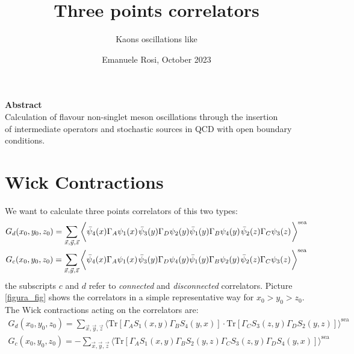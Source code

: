 \documentclass[11pt,a4paper]{article}
\begin{document}
\title{Three points correlators}
\author{Kaons oscillations like}
\date{Emanuele Rosi, October 2023}
\maketitle

\begin{center}
    {\bf Abstract}\\
    Calculation of flavour non-singlet meson oscillations through the insertion \\ of intermediate operators and stochastic sources in QCD with open boundary conditions.
\end{center}

\section{Wick Contractions}
We want to calculate three points correlators of this two types:
\begin{equation}
    \begin{gathered}
        G_d(x_0,y_0,z_0) = \sum_{\vec x, \vec y, \vec z} \bigg\langle
        \bar\psi_4(x) \Gamma_A \psi_1 (x)\hspace*{.3mm}
        \bar\psi_3(y) \Gamma_D \psi_2 (y) \bar\psi_1(y) \Gamma_B \psi_4 (y)\hspace*{.3mm}
        \bar\psi_2(z) \Gamma_C \psi_3 (z)\hspace*{.3mm}
        \bigg\rangle^{\text{sea}}\\
        G_c(x_0,y_0,z_0) = \sum_{\vec x, \vec y, \vec z} \bigg\langle
        \bar\psi_4(x) \Gamma_A \psi_1 (x)\hspace*{.3mm}
        \bar\psi_3(y) \Gamma_D \psi_4 (y) \bar\psi_1(y) \Gamma_B \psi_2 (y)\hspace*{.3mm}
        \bar\psi_2(z) \Gamma_C \psi_3 (z)\hspace*{.3mm}
        \bigg\rangle^{\text{sea}}\\
    \end{gathered}
\end{equation}
the subscripts $c$ and $d$ refer to {\it connected} and {\it disconnected} correlators.
Picture \ref{figura_fig} shows the correlators in a simple representative way for $x_0>y_0>z_0$.
The Wick contractions acting on the correlators are:
\begin{equation}\label{eq:contractions}
    \begin{gathered}
        G_d(x_0,y_0,z_0) = \sum_{\vec x, \vec y, \vec z} \bigg\langle \text{Tr}\left[\Gamma_A S_1(x,y)\Gamma_B S_4(y,x)\right]\cdot\text{Tr}\left[\Gamma_C S_3(z,y)\Gamma_D S_2(y,z)\right] \bigg\rangle^{\text{sea}} \\
        G_c(x_0,y_0,z_0) = - \sum_{\vec x, \vec y, \vec z} \bigg\langle \text{Tr}\left[\Gamma_A S_1(x,y)\Gamma_B S_2(y,z)\Gamma_C S_3(z,y)\Gamma_D S_4(y,x)\right] \bigg\rangle^{\text{sea}}
    \end{gathered}
\end{equation}
\end{document}
